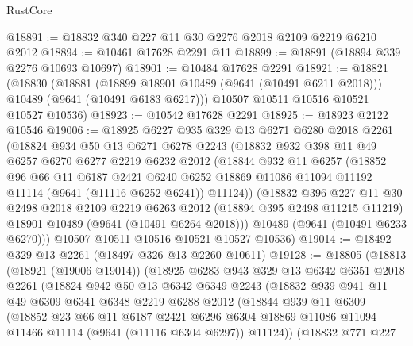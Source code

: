 \begin{lexlean}{RustCore}
\begin{coremodule}
@18891 := @18832 @340 @227 @11 @30 @2276 @2018 @2109 @2219 @6210 @2012
@18894 := @10461 @17628 @2291 @11
@18899 := @18891 (@18894 @339 @2276 @10693 @10697)
@18901 := @10484 @17628 @2291
@18921 := @18821
    (@18830
      (@18881
        (@18899 @18901 @10489 (@9641 (@10491 @6211 @2018)))
        @10489
        (@9641 (@10491 @6183 @6217)))
      @10507
      @10511
      @10516
      @10521
      @10527
      @10536)
@18923 := @10542 @17628 @2291
@18925 := @18923 @2122 @10546
@19006 := @18925
    @6227
    @935
    @329
    @13
    @6271
    @6280
    @2018
    @2261
    (@18824
      @934
      @50
      @13
      @6271
      @6278
      @2243
      (@18832
        @932
        @398
        @11
        @49
        @6257
        @6270
        @6277
        @2219
        @6232
        @2012
        (@18844
          @932
          @11
          @6257
          (@18852
            @96
            @66
            @11
            @6187
            @2421
            @6240
            @6252
            @18869
            @11086
            @11094
            @11192
            @11114
            (@9641 (@11116 @6252 @6241))
            @11124))
        (@18832
          @396
          @227
          @11
          @30
          @2498
          @2018
          @2109
          @2219
          @6263
          @2012
          (@18894 @395 @2498 @11215 @11219)
          @18901
          @10489
          (@9641 (@10491 @6264 @2018)))
        @10489
        (@9641 (@10491 @6233 @6270)))
      @10507
      @10511
      @10516
      @10521
      @10527
      @10536)
@19014 := @18492 @329 @13 @2261 (@18497 @326 @13 @2260 @10611)
@19128 := @18805
    (@18813
      (@18921 (@19006 @19014))
      (@18925
        @6283
        @943
        @329
        @13
        @6342
        @6351
        @2018
        @2261
        (@18824
          @942
          @50
          @13
          @6342
          @6349
          @2243
          (@18832
            @939
            @941
            @11
            @49
            @6309
            @6341
            @6348
            @2219
            @6288
            @2012
            (@18844
              @939
              @11
              @6309
              (@18852
                @23
                @66
                @11
                @6187
                @2421
                @6296
                @6304
                @18869
                @11086
                @11094
                @11466
                @11114
                (@9641 (@11116 @6304 @6297))
                @11124))
            (@18832
              @771
              @227

\end{coremodule}
\end{lexlean}
